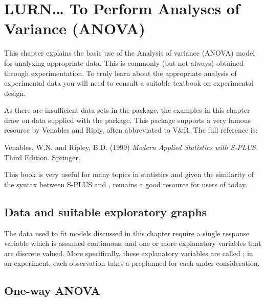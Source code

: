 



\chapter{LURN\ldots{} To Perform Analyses of Variance (ANOVA)} 
\label{ANOVA} 
 
 



 
This chapter explains the basic use of the Analysis of variance (ANOVA) model for analyzing appropriate data. This is commonly (but not always) obtained through experimentation. To truly learn about the appropriate analysis of experimental data you will need to consult a suitable textbook on experimental design. 
 
As there are insufficient data sets in the  package, the examples in this chapter draw on data supplied with the  package. This package supports a very famous resource by Venables and Riply, often abbreviated to V\&R. The full reference is: 
 
Venables, W.N. and Ripley, B.D. (1999) {\it Modern Applied Statistics with S-PLUS.} Third Edition. Springer.  
 
This book is very useful for many topics in statistics and given the similarity of the syntax between S-PLUS and \R{}, remains a good resource for users of \R{} today. 
 
 
 
\section{Data and suitable exploratory graphs} 
 
The data used to fit models discussed in this chapter require a single response variable which is assumed continuous, and one or more explanatory variables that are discrete valued. More specifically, these explanatory variables are called ; in an experiment, each observation takes a preplanned  for each  under consideration. 
 
\section{One-way ANOVA} 
 
